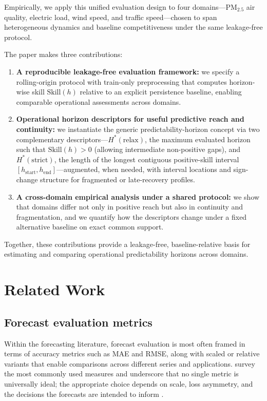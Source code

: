 \documentclass[pdflatex]{sn-jnl}
\begin{document}
Empirically, we apply this unified evaluation design to four domains—PM$_{2.5}$ air quality, electric load, wind speed, and traffic speed—chosen to span heterogeneous dynamics and baseline competitiveness under the same leakage-free protocol.

The paper makes three contributions:
\begin{enumerate}
  \item \textbf{A reproducible leakage-free evaluation framework:} we specify a rolling-origin protocol with train-only preprocessing that computes horizon-wise skill $\mathrm{Skill}(h)$ relative to an explicit persistence baseline, enabling comparable operational assessments across domains.
  \item \textbf{Operational horizon descriptors for useful predictive reach and continuity:} we instantiate the generic predictability-horizon concept via two complementary descriptors—$H^*(\mathrm{relax})$, the maximum evaluated horizon such that $\mathrm{Skill}(h)>0$ (allowing intermediate non-positive gaps), and $H^*(\mathrm{strict})$, the length of the longest contiguous positive-skill interval $[h_{\mathrm{start}},h_{\mathrm{end}}]$—augmented, when needed, with interval locations and sign-change structure for fragmented or late-recovery profiles.
  \item \textbf{A cross-domain empirical analysis under a shared protocol:} we show that domains differ not only in positive reach but also in continuity and fragmentation, and we quantify how the descriptors change under a fixed alternative baseline on exact common support.
\end{enumerate}

Together, these contributions provide a leakage-free, baseline-relative basis for estimating and comparing operational predictability horizons across domains.


\section{Related Work}

\subsection{Forecast evaluation metrics}

Within the forecasting literature, forecast evaluation is most often framed in terms of
accuracy metrics such as MAE and RMSE, along with scaled or relative variants that enable
comparisons across different series and applications. \citet{hyndman2006} survey
the most commonly used measures and underscore that no single metric is universally ideal;
the appropriate choice depends on scale, loss asymmetry, and the decisions the forecasts are
intended to inform \citep{petropoulos2022}.
\end{document}

